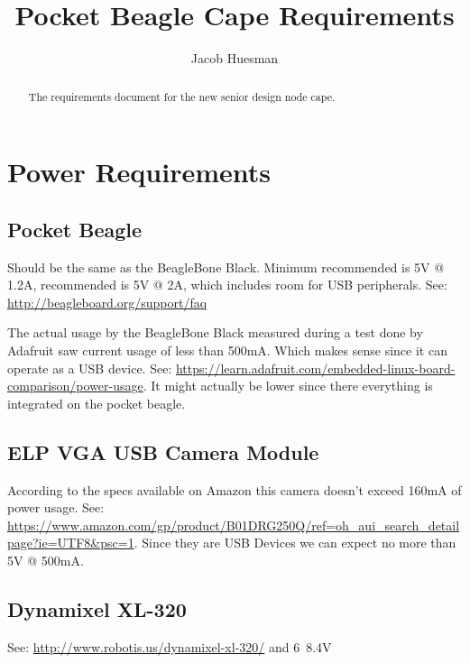 \documentclass[]{article}
\title{Pocket Beagle Cape Requirements}
\author{Jacob Huesman}
\begin{document}
\maketitle

\begin{abstract}
The requirements document for the new senior design node cape.
\end{abstract}

\section{Power Requirements}
\subsection{Pocket Beagle}
Should be the same as the BeagleBone Black. Minimum recommended is 5V @ 1.2A, recommended is 5V @ 2A, which includes room for USB peripherals. See: \url{http://beagleboard.org/support/faq}

The actual usage by the BeagleBone Black measured during a test done by Adafruit saw current usage of less than 500mA. Which makes sense since it can operate as a USB device. See: \url{https://learn.adafruit.com/embedded-linux-board-comparison/power-usage}. It might actually be lower since there everything is integrated on the pocket beagle.

\subsection{ELP VGA USB Camera Module}
According to the specs available on Amazon this camera doesn't exceed 160mA of power usage. See: \url{https://www.amazon.com/gp/product/B01DRG250Q/ref=oh_aui_search_detailpage?ie=UTF8&psc=1}. Since they are USB Devices we can expect no more than 5V @ 500mA. 

\subsection{Dynamixel XL-320}
See: \url{http://www.robotis.us/dynamixel-xl-320/} and
6~8.4V
\end{document}
